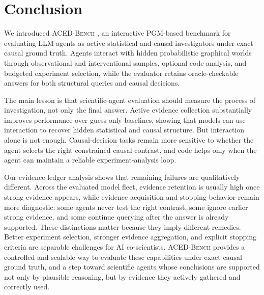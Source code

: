 \documentclass{article}
\newcommand{\bench}{\textsc{ACED-Bench} }
\begin{document}
\section{Conclusion}
\label{sec:conclusion}

We introduced \bench, an interactive PGM-based benchmark for evaluating LLM agents as active statistical and causal investigators under exact causal ground truth.
Agents interact with hidden probabilistic graphical worlds through observational and interventional samples, optional code analysis, and budgeted experiment selection, while the evaluator retains oracle-checkable answers for both structural queries and causal decisions.

The main lesson is that scientific-agent evaluation should measure the process of investigation, not only the final answer.
Active evidence collection substantially improves performance over guess-only baselines, showing that models can use interaction to recover hidden statistical and causal structure.
But interaction alone is not enough.
Causal-decision tasks remain more sensitive to whether the agent selects the right constrained causal contrast, and code helps only when the agent can maintain a reliable experiment-analysis loop.

Our evidence-ledger analysis shows that remaining failures are qualitatively different.
Across the evaluated model fleet, evidence retention is usually high once strong evidence appears, while evidence acquisition and stopping behavior remain more diagnostic: some agents never test the right contrast, some ignore earlier strong evidence, and some continue querying after the answer is already supported.
These distinctions matter because they imply different remedies.
Better experiment selection, stronger evidence aggregation, and explicit stopping criteria are separable challenges for AI co-scientists.
\bench provides a controlled and scalable way to evaluate these capabilities under exact causal ground truth, and a step toward scientific agents whose conclusions are supported not only by plausible reasoning, but by evidence they actively gathered and correctly used.

\end{document}
